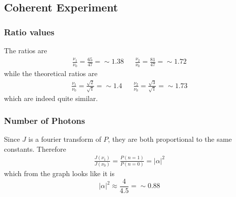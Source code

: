\subsection{Coherent Experiment}
\subsubsection{Ratio values}
The ratios are 
\begin{align}
    \frac{\nu_1}{\nu_0} = \frac{65}{47} = \sim 1.38 && \frac{\nu_2}{\nu_0} = \frac{81}{47} = \sim 1.72
\end{align}
while the theoretical ratios are
\begin{align}
    \frac{\nu_1}{\nu_0} = \frac{\sqrt{2}}{\sqrt{1}}=\sim 1.4 && \frac{\nu_2}{\nu_0} = \frac{\sqrt{3}}{\sqrt{1}} = \sim 1.73
\end{align}
which are indeed quite similar.
\subsubsection{Number of Photons}
Since $J$ is a fourier transform of $P$, they are both proportional to the same constants. Therefore
\begin{align}
    \frac{J(\nu_1)}{J(\nu_0)}=\frac{P(n=1)}{P(n=0)}=\lvert\alpha\rvert^2
\end{align}
which from the graph looks like it is
\begin{equation}
    \lvert\alpha\rvert^2 \approx \frac{4}{4.5} = \sim 0.88
\end{equation}